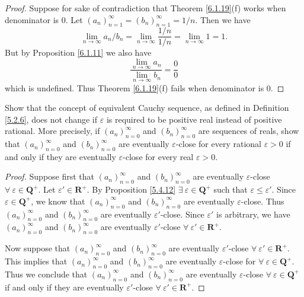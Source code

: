 \begin{proof}
    Suppose for sake of contradiction that Theorem \ref{6.1.19}(f) works when denominator is \(0\).
    Let \((a_n)_{n = 1}^\infty = (b_n)_{n = 1}^\infty = 1 / n\).
    Then we have
    \[
        \lim_{n \to \infty} a_n / b_n = \lim_{n \to \infty} \frac{1 / n}{1 / n} = \lim_{n \to \infty} 1 = 1.
    \]
    But by Proposition \ref{6.1.11} we also have
    \[
        \frac{\lim_{n \to \infty} a_n}{\lim_{n \to \infty} b_n} = \frac{0}{0}
    \]
    which is undefined.
    Thus Theorem \ref{6.1.19}(f) fails when denominator is \(0\).
\end{proof}

\begin{exercise}\label{ex 6.1.10}
    Show that the concept of equivalent Cauchy sequence, as defined in Definition \ref{5.2.6}, does not change if \(\varepsilon\) is required to be positive real instead of positive rational.
    More precisely, if \((a_n)_{n = 0}^\infty\) and \((b_n)_{n = 0}^\infty\) are sequences of reals, show that \((a_n)_{n = 0}^\infty\) and \((b_n)_{n = 0}^\infty\) are eventually \(\varepsilon\)-close for every rational \(\varepsilon > 0\) if and only if they are eventually \(\varepsilon\)-close for every real \(\varepsilon > 0\).
\end{exercise}

\begin{proof}
    Suppose first that \((a_n)_{n = 0}^\infty\) and \((b_n)_{n = 0}^\infty\) are eventually \(\varepsilon\)-close \(\forall\ \varepsilon \in \mathbf{Q}^+\).
    Let \(\varepsilon' \in \mathbf{R}^+\).
    By Proposition \ref{5.4.12} \(\exists\ \varepsilon \in \mathbf{Q}^+\) such that \(\varepsilon \leq \varepsilon'\).
    Since \(\varepsilon \in \mathbf{Q}^+\), we know that \((a_n)_{n = 0}^\infty\) and \((b_n)_{n = 0}^\infty\) are eventually \(\varepsilon\)-close.
    Thus \((a_n)_{n = 0}^\infty\) and \((b_n)_{n = 0}^\infty\) are eventually \(\varepsilon'\)-close.
    Since \(\varepsilon'\) is arbitrary, we have \((a_n)_{n = 0}^\infty\) and \((b_n)_{n = 0}^\infty\) are eventually \(\varepsilon'\)-close \(\forall\ \varepsilon' \in \mathbf{R}^+\).

    Now suppose that \((a_n)_{n = 0}^\infty\) and \((b_n)_{n = 0}^\infty\) are eventually \(\varepsilon'\)-close \(\forall\ \varepsilon' \in \mathbf{R}^+\).
    This implies that \((a_n)_{n = 0}^\infty\) and \((b_n)_{n = 0}^\infty\) are eventually \(\varepsilon\)-close for \(\forall\ \varepsilon \in \mathbf{Q}^+\).
    Thus we conclude that \((a_n)_{n = 0}^\infty\) and \((b_n)_{n = 0}^\infty\) are eventually \(\varepsilon\)-close \(\forall\ \varepsilon \in \mathbf{Q}^+\) if and only if they are eventually \(\varepsilon'\)-close \(\forall\ \varepsilon' \in \mathbf{R}^+\).
\end{proof}